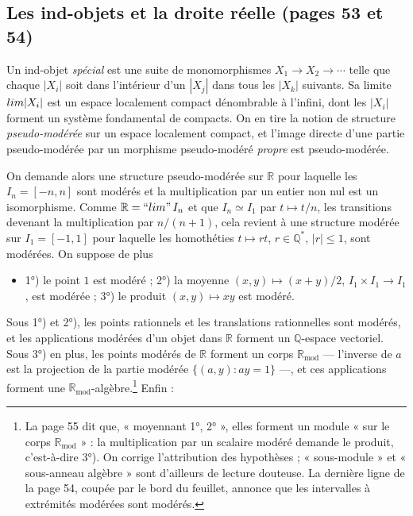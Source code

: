 \documentclass[11pt,a4paper]{article}
\begin{document}
\subsection*{Les ind-objets et la droite réelle (pages 53 et 54)}

Un ind-objet \emph{spécial} est une suite de monomorphismes $X_1 \to X_2 \to
\cdots$ telle que chaque $|X_i|$ soit dans l'intérieur d'un $|X_j|$ dans tous
les $|X_k|$ suivants. Sa limite $\varinjlim |X_i|$ est un espace localement
compact dénombrable à l'infini, dont les $|X_i|$ forment un système
fondamental de compacts. On en tire la notion de structure
\emph{pseudo-modérée} sur un espace localement compact, et l'image directe
d'une partie pseudo-modérée par un morphisme pseudo-modéré \emph{propre} est
pseudo-modérée.

On demande alors une structure pseudo-modérée sur $\mathbb{R}$ pour laquelle
les $I_n = [-n, n]$ sont modérés et la multiplication par un entier non nul est
un isomorphisme. Comme $\mathbb{R} = \text{``}\varinjlim\text{''}\, I_n$ et que
$I_n \simeq I_1$ par $t \mapsto t/n$, les transitions devenant la multiplication
par $n/(n+1)$, cela revient à une structure modérée sur $I_1 = [-1, 1]$ pour
laquelle les homothéties $t \mapsto rt$, $r \in \mathbb{Q}^*$, $|r| \leqslant 1$,
sont modérées. On suppose de plus

\begin{itemize}
\item[M4)] 1°) le point $1$ est modéré ; 2°) la moyenne $(x, y) \mapsto
  (x+y)/2$, $I_1 \times I_1 \to I_1$, est modérée ; 3°) le produit $(x, y)
  \mapsto xy$ est modéré.
\end{itemize}

Sous 1°) et 2°), les points rationnels et les translations rationnelles sont
modérés, et les applications modérées d'un objet dans $\mathbb{R}$ forment un
$\mathbb{Q}$-espace vectoriel. Sous 3°) en plus, les points modérés de
$\mathbb{R}$ forment un corps $\mathbb{R}_{\mathrm{mod}}$ — l'inverse de $a$
est la projection de la partie modérée $\{ (a, y) : ay = 1 \}$ —, et ces
applications forment une $\mathbb{R}_{\mathrm{mod}}$-algèbre.\footnote{La page
55 dit que, « moyennant 1°, 2° », elles forment un module « sur le corps
$\mathbb{R}_{\mathrm{mod}}$ » : la multiplication par un scalaire modéré
demande le produit, c'est-à-dire 3°). On corrige l'attribution des hypothèses ;
« sous-module » et « sous-anneau algèbre » sont d'ailleurs de lecture
douteuse. La dernière ligne de la page 54, coupée par le bord du feuillet,
annonce que les intervalles à extrémités modérées sont modérés.} Enfin :
\end{document}
